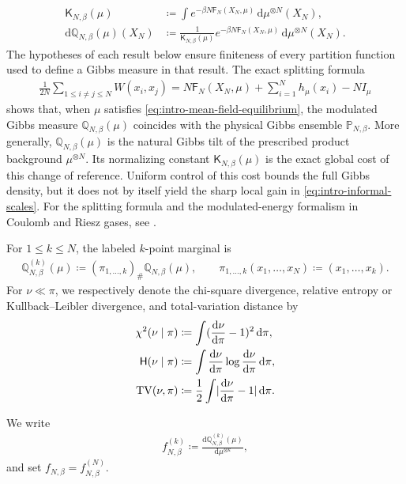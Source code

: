 \documentclass[11pt,reqno]{amsart}
\numberwithin{equation}{section}
\theoremstyle{plain}
\theoremstyle{remark}
\DeclarePairedDelimiter{\pa}{\lparen}{\rparen}
\DeclarePairedDelimiter{\abs}{\lvert}{\rvert}
\newcommand{\md}{\mathrm{d}}
\newcommand{\Q}{{\mathbb{Q}}}
\newcommand{\Pb}{{\mathbb{P}}}
\newcommand{\K}{{\mathsf{K}}}
\newcommand{\Fr}{{\mathsf{F}}}
\newcommand{\Hr}{{\mathsf{H}}}
\newcommand{\XN}{X_N}
\newcommand{\be}{\beta}
\newcommand{\Chi}{\chi^2}
\newcommand{\TV}{\operatorname{TV}}
\begin{document}
\begin{align}\label{eq:K-Q-def-intro}
 \K_{N,\be}(\mu)
 &\coloneqq
 \int e^{-\be N\Fr_N(\XN,\mu)}\,\md\mu^{\otimes N}(\XN),\\
 \md\Q_{N,\be}(\mu)(\XN)
 &\coloneqq
 \frac{1}{\K_{N,\be}(\mu)}e^{-\be N\Fr_N(\XN,\mu)}\,\md\mu^{\otimes N}(\XN).
\end{align}
The hypotheses of each result below ensure finiteness of every partition function used to define a Gibbs measure in that result.  The exact splitting formula
\begin{align}\label{eq:intro-splitting-formula}
 \frac{1}{2N}\sum_{1\le i\ne j\le N}W(x_i,x_j)
 =N\Fr_N(\XN,\mu)+\sum_{i=1}^N h_\mu(x_i)-NI_\mu
\end{align}
shows that, when \(\mu\) satisfies \eqref{eq:intro-mean-field-equilibrium}, the modulated Gibbs measure \(\Q_{N,\be}(\mu)\) coincides with the physical Gibbs ensemble \(\Pb_{N,\be}\).  More generally, \(\Q_{N,\be}(\mu)\) is the natural Gibbs tilt of the prescribed product background \(\mu^{\otimes N}\).  Its normalizing constant \(\K_{N,\be}(\mu)\) is the exact global cost of this change of reference.  Uniform control of this cost bounds the full Gibbs density, but it does not by itself yield the sharp local gain in \eqref{eq:intro-informal-scales}.  For the splitting formula and the modulated-energy formalism in Coulomb and Riesz gases, see \cite[Chapter~5, Section~5.1]{SerfatyLN}.

For \(1\le k\le N\), the labeled \(k\)-point marginal is
\begin{align}\label{eq:labeled-k-marginal-def}
 \Q_{N,\be}^{(k)}(\mu)
 \coloneqq
 (\pi_{1,\ldots,k})_\#\Q_{N,\be}(\mu),
 \qquad
 \pi_{1,\ldots,k}(x_1,\ldots,x_N)\coloneqq(x_1,\ldots,x_k).
\end{align}
For \(\nu\ll\pi\), we respectively denote the chi-square divergence, relative entropy or Kullback--Leibler divergence, and total-variation distance by
\begin{align}\label{eq:divergence-definitions-intro}
 \Chi(\nu\mid\pi)
 &\coloneqq\int\pa{\frac{\md\nu}{\md\pi}-1}^2\,\md\pi,\\
 \Hr(\nu\mid\pi)
 &\coloneqq\int\frac{\md\nu}{\md\pi}\log\frac{\md\nu}{\md\pi}\,\md\pi,\\
 \TV(\nu,\pi)
 &\coloneqq\frac12\int\abs{\frac{\md\nu}{\md\pi}-1}\,\md\pi.
\end{align}

We write
\begin{align}\label{eq:gibbs-marginal-density-ratio}
 f_{N,\be}^{(k)}
 \coloneqq
 \frac{\md\Q_{N,\be}^{(k)}(\mu)}{\md\mu^{\otimes k}},
\end{align}
and set $f_{N,\be}=f_{N,\be}^{(N)}$.
\end{document}
